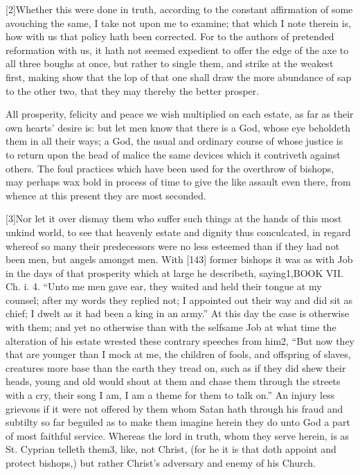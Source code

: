 [2]Whether this were done in truth, according to the constant affirmation of some avouching the same, I take not upon me to examine; that which I note therein is, how with us that policy hath been corrected. For to the authors of pretended reformation with us, it hath not seemed expedient to offer the edge of the axe to all three boughs at once, but rather to single them, and strike at the weakest first, making show that the lop of that one shall draw the more abundance of sap to the other two, that they may thereby the better prosper.

All prosperity, felicity and peace we wish multiplied on each estate, as far as their own hearts’ desire is: but let men know that there is a God, whose eye beholdeth them in all their ways; a God, the usual and ordinary course of whose justice is to return upon the head of malice the same devices which it contriveth against others. The foul practices which have been used for the overthrow of bishops, may perhaps wax bold in process of time to give the like assault even there, from whence at this present they are most seconded.

[3]Nor let it over dismay them who suffer such things at the hands of this most unkind world, to see that heavenly estate and dignity thus conculcated, in regard whereof so many their predecessors were no less esteemed than if they had not been men, but angels amongst men. With [143] former bishops it was as with Job in the days of that prosperity which at large he describeth, saying1,BOOK VII. Ch. i. 4. “Unto me men gave ear, they waited and held their tongue at my counsel; after my words they replied not; I appointed out their way and did sit as chief; I dwelt as it had been a king in an army.” At this day the case is otherwise with them; and yet no otherwise than with the selfsame Job at what time the alteration of his estate wrested these contrary speeches from him2, “But now they that are younger than I mock at me, the children of fools, and offspring of slaves, creatures more base than the earth they tread on, such as if they did shew their heads, young and old would shout at them and chase them through the streets with a cry, their song I am, I am a theme for them to talk on.” An injury less grievous if it were not offered by them whom Satan hath through his fraud and subtilty so far beguiled as to make them imagine herein they do unto God a part of most faithful service. Whereas the lord in truth, whom they serve herein, is as St. Cyprian telleth them3, like, not Christ, (for he it is that doth appoint and protect bishops,) but rather Christ’s adversary and enemy of his Church.

